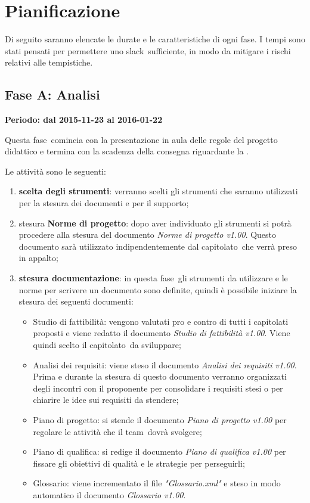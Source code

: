 \documentclass[../PianoProgetto.tex]{subfiles}
\begin{document}
\section{Pianificazione}

	Di seguito saranno elencate le durate e le caratteristiche di ogni fase\g . I tempi sono stati pensati per permettere uno slack\g\ sufficiente, in modo da mitigare i rischi relativi alle tempistiche.
	
	\subsection{Fase A: Analisi}
	
	\textbf{Periodo: dal 2015-11-23 al 2016-01-22}

	Questa fase\g\ comincia con la presentazione in aula delle regole del progetto didattico e termina con la scadenza della consegna riguardante la \revisionedeirequisiti .

	Le attività sono le seguenti:
	\begin{enumerate}
		\item \textbf{scelta degli strumenti}: verranno scelti gli strumenti che saranno utilizzati per la stesura dei documenti e per il supporto;
		\item stesura \textbf{Norme di progetto}: dopo aver individuato gli strumenti si potrà procedere alla stesura del documento \textit{Norme di progetto v1.00}. Questo documento sarà utilizzato indipendentemente dal capitolato\g\ che verrà preso in appalto;
		\item \textbf{stesura documentazione}: in questa fase\g{}li strumenti da utilizzare e le norme per scrivere un documento sono definite, quindi è possibile iniziare la stesura dei seguenti documenti:
		\begin{itemize}
		\item Studio di fattibilità: vengono valutati pro e contro di tutti i capitolati proposti e viene redatto il documento \textit{Studio di fattibilità v1.00}. Viene quindi scelto il capitolato\g\ da sviluppare;
		\item Analisi dei requisiti: viene steso il documento \textit{Analisi dei requisiti v1.00}. Prima e durante la stesura di questo documento verranno organizzati degli incontri con il proponente per consolidare i requisiti stesi o per chiarire le idee sui requisiti da stendere;
		\item Piano di progetto: si stende il documento \textit{Piano di progetto v1.00} per regolare le attività che il team\g\ dovrà svolgere;
		\item Piano di qualifica: si redige il documento \textit{Piano di qualifica v1.00} per fissare gli obiettivi di qualità e le strategie per perseguirli;
		\item Glossario: viene incrementato il file \textit{"Glossario.xml"} e steso in modo automatico il documento \textit{Glossario v1.00}.
		\end{itemize}
	\end{enumerate}
		\newpage
\end{document}
